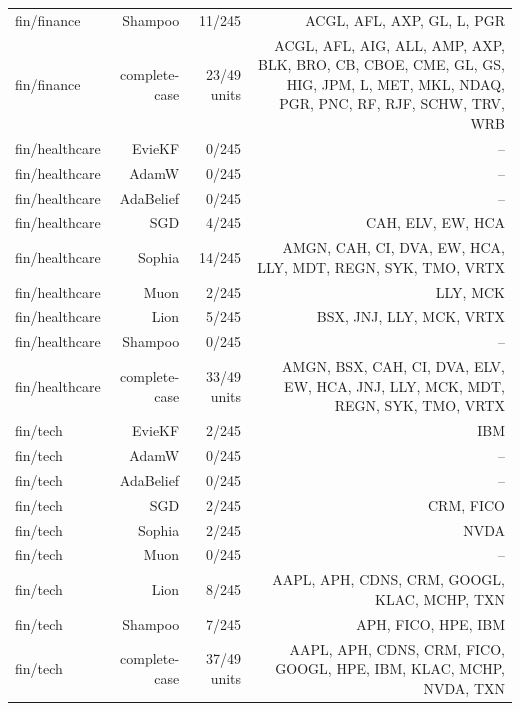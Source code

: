 \begin{table}[t]
\begin{tabular}{lrrr}
fin/finance & Shampoo & 11/245 & ACGL, AFL, AXP, GL, L, PGR \\
fin/finance & complete-case & 23/49 units & ACGL, AFL, AIG, ALL, AMP, AXP, BLK, BRO, CB, CBOE, CME, GL, GS, HIG, JPM, L, MET, MKL, NDAQ, PGR, PNC, RF, RJF, SCHW, TRV, WRB \\
fin/healthcare & EvieKF & 0/245 & -- \\
fin/healthcare & AdamW & 0/245 & -- \\
fin/healthcare & AdaBelief & 0/245 & -- \\
fin/healthcare & SGD & 4/245 & CAH, ELV, EW, HCA \\
fin/healthcare & Sophia & 14/245 & AMGN, CAH, CI, DVA, EW, HCA, LLY, MDT, REGN, SYK, TMO, VRTX \\
fin/healthcare & Muon & 2/245 & LLY, MCK \\
fin/healthcare & Lion & 5/245 & BSX, JNJ, LLY, MCK, VRTX \\
fin/healthcare & Shampoo & 0/245 & -- \\
fin/healthcare & complete-case & 33/49 units & AMGN, BSX, CAH, CI, DVA, ELV, EW, HCA, JNJ, LLY, MCK, MDT, REGN, SYK, TMO, VRTX \\
fin/tech & EvieKF & 2/245 & IBM \\
fin/tech & AdamW & 0/245 & -- \\
fin/tech & AdaBelief & 0/245 & -- \\
fin/tech & SGD & 2/245 & CRM, FICO \\
fin/tech & Sophia & 2/245 & NVDA \\
fin/tech & Muon & 0/245 & -- \\
fin/tech & Lion & 8/245 & AAPL, APH, CDNS, CRM, GOOGL, KLAC, MCHP, TXN \\
fin/tech & Shampoo & 7/245 & APH, FICO, HPE, IBM \\
fin/tech & complete-case & 37/49 units & AAPL, APH, CDNS, CRM, FICO, GOOGL, HPE, IBM, KLAC, MCHP, NVDA, TXN \\
\bottomrule
\end{tabular}
\end{table}
